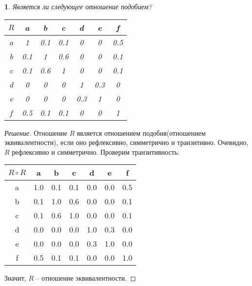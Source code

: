 \documentclass[11pt,a4paper,oneside]{article}
\newenvironment{problem}{
	\medskip
	\begin{problem-internal}
	}{
	\end{problem-internal}
}
\newenvironment{solution}{
	\begin{proof}[Решение]
		\vspace{-8px}
		\setlength{\parskip}{4px}
		\setlength{\parindent}{0px}
	}{
	\end{proof}
}
\newtheorem{problem-internal}{}
\newcommand{\+}{$\boldsymbol{+}$}
\begin{document}
	\begin{problem}
		 Является ли следующее отношение подобием?
		 \begin{table}[!hbtp]
		 	\centering
		 	\begin{tabular}{|c|c|c|c|c|c|c|}
		 		\hline
		 		$R$ & a   & b   & c   & d   & e   & f   \\ \hline
		 		a   & 1   & 0.1 & 0.1 & 0   & 0   & 0.5 \\ \hline
		 		b   & 0.1 & 1   & 0.6 & 0   & 0   & 0.1 \\ \hline
		 		c   & 0.1 & 0.6 & 1   & 0   & 0   & 0.1 \\ \hline
		 		d   & 0   & 0   & 0   & 1   & 0.3 & 0   \\ \hline
		 		e   & 0   & 0   & 0   & 0.3 & 1   & 0   \\ \hline
		 		f   & 0.5 & 0.1 & 0.1 & 0   & 0   & 1   \\ \hline
		 	\end{tabular}
		 \end{table}
	\end{problem}
	\begin{solution}
		Отношение $R$ является отношением подобия(отношением эквивалентности), если оно рефлексивно, симметрично и транзитивно. Очевидно, $R$ рефлексивно и симметрично. Проверим транзитивность: 
		\begin{table}[!hbtp]
			\centering
			\begin{tabular}{|c|c|c|c|c|c|c|}
				\hline
				$R \circ R$ & a  &    b& c	 & d   & e	 & f \\ \hline
				a			&1.0 & 0.1 & 0.1 & 0.0 & 0.0 & 0.5 \\ \hline
				b			&0.1 & 1.0 & 0.6 & 0.0 & 0.0 & 0.1 \\ \hline
				c			&0.1 & 0.6 & 1.0 & 0.0 & 0.0 & 0.1 \\ \hline
				d			&0.0 & 0.0 & 0.0 & 1.0 & 0.3 & 0.0 \\ \hline
				e			&0.0 & 0.0 & 0.0 & 0.3 & 1.0 & 0.0 \\ \hline
				f			&0.5 & 0.1 & 0.1 & 0.0 & 0.0 & 1.0 \\ \hline
			\end{tabular}
		\end{table}
	
		Значит, $R$ -- отношение эквивалентности.
	\end{solution}
\end{document}
